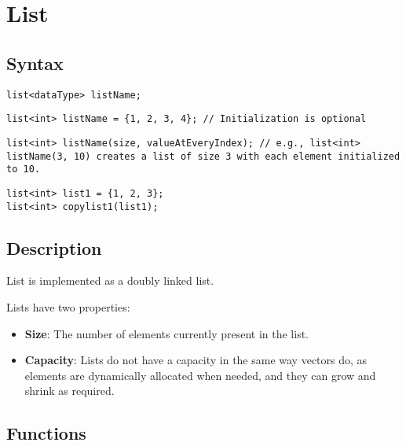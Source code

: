 \documentclass{article}
\begin{document}
\newpage
\section{List}

\subsection{Syntax}

\begin{lstlisting}
list<dataType> listName; 
\end{lstlisting}

\begin{lstlisting}
list<int> listName = {1, 2, 3, 4}; // Initialization is optional
\end{lstlisting}

\begin{lstlisting}
list<int> listName(size, valueAtEveryIndex); // e.g., list<int> listName(3, 10) creates a list of size 3 with each element initialized to 10.
\end{lstlisting}

\begin{lstlisting}
list<int> list1 = {1, 2, 3};
list<int> copylist1(list1);
\end{lstlisting}

\subsection{Description}

List is implemented as a doubly linked list.

\noindent Lists have two properties:
\begin{itemize}
    \item \textbf{Size}: The number of elements currently present in the list.
    \item \textbf{Capacity}: Lists do not have a capacity in the same way vectors do, as elements are dynamically allocated when needed, and they can grow and shrink as required.
\end{itemize}

\subsection{Functions}
\end{document}
